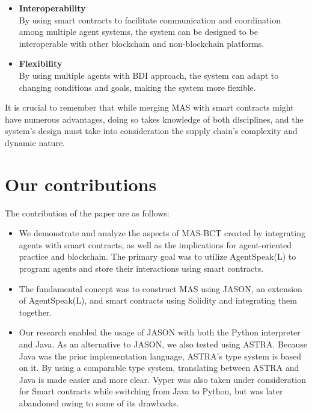\begin{itemize}
\vspace{.5cm}

\item \textbf{Interoperability} \\ By using smart contracts to facilitate communication and coordination among multiple agent systems, the system can be designed to be interoperable with other blockchain and non-blockchain platforms.

\vspace{.5cm}

\item \textbf{Flexibility} \\ By using multiple agents with \ac{BDI} approach, the system can adapt to changing conditions and goals, making the system more flexible.
\end{itemize}

It is crucial to remember that while merging \ac{MAS} with smart contracts might have numerous advantages, doing so takes knowledge of both disciplines, and the system's design must take into consideration the supply chain's complexity and dynamic nature.

\section{Our contributions}

The contribution of the paper are as follows:

\begin{itemize}

    \item We demonstrate and analyze the aspects of \ac{MAS}-\ac{BCT} created by integrating agents with smart contracts, as well as the implications for agent-oriented practice and blockchain. The primary goal was to utilize AgentSpeak(L) to program agents and store their interactions using smart contracts.
    
\vspace{.5cm}

    \item  The fundamental concept was to construct \ac{MAS} using JASON, an extension of AgentSpeak(L), and smart contracts using Solidity and integrating them together.
    
\vspace{.5cm}

    \item Our research enabled the usage of JASON with both the Python interpreter and Java. As an alternative to JASON, we also tested using \ac{ASTRA}. Because Java was the prior implementation language, \ac{ASTRA}'s type system is based on it. By using a comparable type system, translating between \ac{ASTRA} and Java is made easier and more clear. Vyper was also taken under consideration for Smart contracts while switching from Java to Python, but was later abandoned owing to some of its drawbacks.
    
\vspace{.5cm}

\end{itemize}

